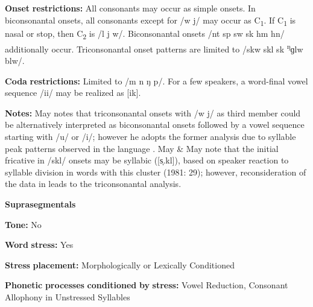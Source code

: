 \documentclass[output=paper]{langsci/langscibook}
\begin{document}
\begin{styleBody}
\textbf{Onset} \textbf{restrictions:} All consonants may occur as simple onsets. In biconsonantal onsets, all consonants except for /w j/ may occur as C\textsubscript{1}. If C\textsubscript{1} is nasal or stop, then C\textsubscript{2} is /l j w/. Biconsonantal onsets /nt sp sw sk hm hn/ additionally occur. Triconsonantal onset patterns are limited to /skw skl sk \textsuperscript{ŋ}ɡlw blw/.
\end{styleBody}

\begin{styleBody}
\textbf{Coda} \textbf{restrictions:} Limited to /m n ŋ p/. For a few speakers, a word-final vowel sequence /ii/ may be realized as [ik].
\end{styleBody}

\begin{styleBody}
\textbf{Notes:} May notes that triconsonantal onsets with /w j/ as third member could be alternatively interpreted as biconsonantal onsets followed by a vowel sequence starting with /u/ or /i/; however he adopts the former analysis due to syllable peak patterns observed in the language \citep[17-18]{May1997}. May \& May note that the initial fricative in /skl/ onsets may be syllabic ([s̩.kl]), based on speaker reaction to syllable division in words with this cluster (1981: 29); however, reconsideration of the data in \citealt{May1997} leads to the triconsonantal analysis.
\end{styleBody}

\begin{styleBody}
\textbf{Suprasegmentals}
\end{styleBody}

\begin{styleBody}
\textbf{Tone:} No
\end{styleBody}

\begin{styleBody}
\textbf{Word} \textbf{stress:} Yes
\end{styleBody}

\begin{styleBody}
\textbf{Stress} \textbf{placement:} Morphologically or Lexically Conditioned
\end{styleBody}

\begin{styleBody}
\textbf{Phonetic} \textbf{processes} \textbf{conditioned} \textbf{by} \textbf{stress:} Vowel Reduction, Consonant Allophony in Unstressed Syllables
\end{styleBody}
\end{document}

